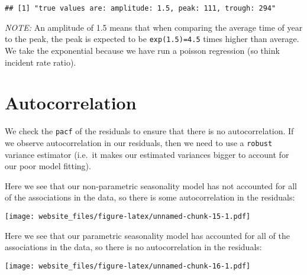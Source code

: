 \documentclass[]{book}
\newenvironment{Shaded}{\begin{snugshade}}{\end{snugshade}}
\newcommand{\KeywordTok}[1]{\textcolor[rgb]{0.13,0.29,0.53}{\textbf{#1}}}
\newcommand{\DataTypeTok}[1]{\textcolor[rgb]{0.13,0.29,0.53}{#1}}
\newcommand{\StringTok}[1]{\textcolor[rgb]{0.31,0.60,0.02}{#1}}
\newcommand{\OperatorTok}[1]{\textcolor[rgb]{0.81,0.36,0.00}{\textbf{#1}}}
\newcommand{\ErrorTok}[1]{\textcolor[rgb]{0.64,0.00,0.00}{\textbf{#1}}}
\newcommand{\NormalTok}[1]{#1}
\begin{document}
\begin{verbatim}
## [1] "true values are: amplitude: 1.5, peak: 111, trough: 294"
\end{verbatim}

\emph{NOTE:} An amplitude of 1.5 means that when comparing the average
time of year to the peak, the peak is expected to be
\texttt{exp(1.5)=4.5} times higher than average. We take the exponential
because we have run a poisson regression (so think incident rate ratio).

\section{Autocorrelation}\label{autocorrelation-1}

We check the \texttt{pacf} of the residuals to ensure that there is no
autocorrelation. If we observe autocorrelation in our residuals, then we
need to use a \texttt{robust} variance estimator (i.e.~it makes our
estimated variances bigger to account for our poor model fitting).

Here we see that our non-parametric seasonality model has not accounted
for all of the associations in the data, so there is some
autocorrelation in the residuals:

\begin{Shaded}
\end{Shaded}

\texttt{[image: website\_files/figure-latex/unnamed-chunk-15-1.pdf]}

Here we see that our parametric seasonality model has accounted for all
of the associations in the data, so there is no autocorrelation in the
residuals:

\begin{Shaded}
\end{Shaded}

\texttt{[image: website\_files/figure-latex/unnamed-chunk-16-1.pdf]}


\end{document}
